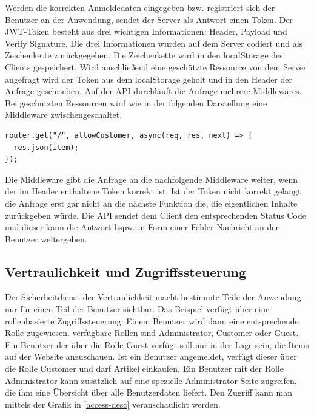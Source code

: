 \documentclass[utf8,biblatex]{lni}
\begin{document}
Werden die korrekten Anmeldedaten eingegeben bzw. registriert sich der Benutzer an der 
Anwendung, sendet der Server als Antwort einen Token. 
Der JWT-Token besteht aus drei wichtigen Informationen: Header, Payload und Verify Signature.
Die drei Informationen wurden auf dem Server codiert und als Zeichenkette zurückgegeben. 
Die Zeichenkette wird in den localStorage des Clients gespeichert. Wird anschließend eine 
geschützte Ressource von dem Server angefragt wird der Token aus dem localStorage geholt 
und in den Header der Anfrage geschrieben.
Auf der API durchläuft die Anfrage mehrere Middlewares. 
Bei geschützten Ressourcen wird wie in der folgenden Darstellung eine Middleware 
zwischengeschaltet. 

\begin{verbatim}
router.get("/", allowCustomer, async(req, res, next) => {
  res.json(item);
});
\end{verbatim}

Die Middleware gibt die Anfrage an die nachfolgende Middleware weiter, wenn der im Header enthaltene 
Token korrekt ist. Ist der Token nicht korrekt gelangt die Anfrage erst gar nicht an die nächste Funktion die,
die eigentlichen Inhalte zurückgeben würde. 
Die API sendet dem Client den entsprechenden Status Code und dieser kann die Antwort bspw. in Form 
einer Fehler-Nachricht an den Benutzer weitergeben. 

\subsection{Vertraulichkeit und Zugriffssteuerung}

Der Sicherheitdienst der Vertraulichkeit macht bestimmte Teile der Anwendung nur für einen Teil der Benutzer sichtbar. 
Das Beispiel verfügt über eine rollenbasierte Zugriffssteuerung. 
Einem Benutzer wird dann eine entsprechende Rolle zugewiesen. verfügbare Rollen sind Administrator, Customer oder Guest.
Ein Benutzer der über die Rolle \glqq Guest\grqq{} verfügt soll nur in der Lage sein, die Items auf der Website anzuschauen. 
Ist ein Benutzer angemeldet, verfügt dieser über die Rolle \glqq Customer\grqq{} und darf Artikel einkaufen. 
Ein Benutzer mit der Rolle Administrator kann zusätzlich auf eine spezielle Administrator Seite zugreifen, die ihm eine Übersicht über 
alle Benutzerdaten liefert. 
Den Zugriff kann man mittels der Grafik in \autoref*{access-desc} veranschaulicht werden.
\end{document}
